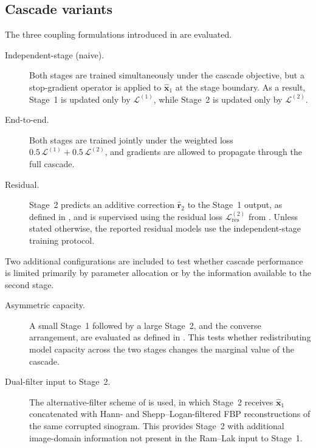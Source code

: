 \subsection{Cascade variants}
\label{subsec:exp_variants}

The three coupling formulations introduced in  are evaluated.

\begin{description}
    \item[Independent-stage (naive).] Both stages are trained simultaneously under the cascade objective, but a stop-gradient operator is applied to $\hat{\mathbf{x}}_1$ at the stage boundary. As a result, Stage~1 is updated only by $\mathcal{L}^{(1)}$, while Stage~2 is updated only by $\mathcal{L}^{(2)}$.

    \item[End-to-end.] Both stages are trained jointly under the weighted loss $0.5\,\mathcal{L}^{(1)} + 0.5\,\mathcal{L}^{(2)}$, and gradients are allowed to propagate through the full cascade.

    \item[Residual.] Stage~2 predicts an additive correction $\hat{\mathbf{r}}_2$ to the Stage~1 output, as defined in , and is supervised using the residual loss $\mathcal{L}^{(2)}_{\mathrm{res}}$ from . Unless stated otherwise, the reported residual models use the independent-stage training protocol.
\end{description}

Two additional configurations are included to test whether cascade performance is limited primarily by parameter allocation or by the information available to the second stage.

\begin{description}
    \item[Asymmetric capacity.] A small Stage~1 followed by a large Stage~2, and the converse arrangement, are evaluated as defined in . This tests whether redistributing model capacity across the two stages changes the marginal value of the cascade.

    \item[Dual-filter input to Stage~2.] The alternative-filter scheme of  is used, in which Stage~2 receives $\hat{\mathbf{x}}_1$ concatenated with Hann- and Shepp--Logan-filtered FBP reconstructions of the same corrupted sinogram. This provides Stage~2 with additional image-domain information not present in the Ram--Lak input to Stage~1.
\end{description}
